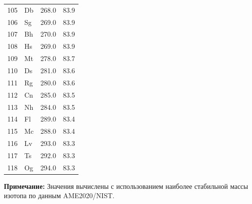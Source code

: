 \documentclass[11pt,a4paper]{article}
\begin{document}
\begin{longtable}{c l c c}
		105& Db  & 268.0  & 83.9 \\
		106& Sg  & 269.0  & 83.9 \\
		107& Bh  & 270.0  & 83.9 \\
		108& Hs  & 269.0  & 83.9 \\
		109& Mt  & 278.0  & 83.7 \\
		110& Ds  & 281.0  & 83.6 \\
		111& Rg  & 280.0  & 83.6 \\
		112& Cn  & 285.0  & 83.5 \\
		113& Nh  & 284.0  & 83.5 \\
		114& Fl  & 289.0  & 83.4 \\
		115& Mc  & 288.0  & 83.4 \\
		116& Lv  & 293.0  & 83.3 \\
		117& Ts  & 292.0  & 83.3 \\
		118& Og  & 294.0  & 83.3 \\
		\bottomrule
	\end{longtable}
	\vspace{0.5cm}
	\noindent
	\textbf{Примечание:} Значения вычислены с использованием наиболее стабильной массы изотопа по данным AME2020/NIST.
	
\end{document}
